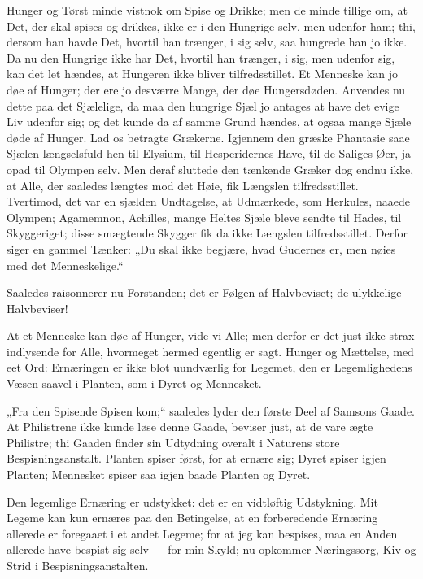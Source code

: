 \documentclass[12pt,a4paper]{book}
\newcommand{\apage}[1]{\marginnote{\footnotesize\textit{[#1]}}}
\begin{document}
Hunger og Tørst minde vistnok om Spise og Drikke; men de minde tillige om,
at Det, der skal spises og drikkes, ikke er i den Hungrige selv, men
udenfor ham; thi, dersom han havde Det, hvortil han trænger, i sig selv,
saa hungrede han jo ikke. Da nu den Hungrige ikke har Det, hvortil han
trænger, i sig, men udenfor sig, kan det let hændes, at Hungeren ikke
bliver tilfredsstillet. Et Menneske kan jo døe af Hunger; der ere jo
desværre Mange, der døe Hungersdøden. Anvendes nu dette paa det Sjælelige,
da maa den hungrige
Sjæl jo antages at have det evige Liv udenfor sig; og det kunde da af
samme Grund hændes, at ogsaa mange Sjæle døde af Hunger. Lad os betragte
Grækerne. Igjennem den græske Phantasie saae Sjælen længselsfuld hen til
Elysium, til Hesperidernes Have, til de Saliges Øer, ja opad til Olympen
selv. Men deraf sluttede den tænkende Græker dog endnu ikke, at Alle, der
saaledes længtes mod det Høie, fik Længslen tilfredsstillet. Tvertimod,
det var en sjælden Undtagelse, at Udmærkede, som Herkules, naaede
Olympen; Agamemnon, Achilles, mange Heltes Sjæle bleve sendte til Hades,
til Skyggeriget; disse smægtende Skygger fik da ikke Længslen
tilfredsstillet. Derfor siger en gammel Tænker: „Du skal ikke begjære,
hvad Gudernes er, men nøies med det Menneskelige.“

Saaledes raisonnerer nu Forstanden; det er Følgen af Halvbeviset; de
ulykkelige Halvbeviser!

At et Menneske kan døe af Hunger, vide vi Alle; men derfor er det just
ikke strax indlysende for Alle, hvormeget hermed egentlig er sagt. Hunger
og Mættelse, med eet Ord: Ernæringen er ikke blot uundværlig for Legemet,
den er Legemlighedens Væsen saavel i Planten, som i Dyret og Mennesket.

„Fra den Spisende Spisen kom;“ saaledes lyder den første Deel af Samsons
Gaade. At Philistrene ikke kunde løse denne Gaade, beviser just, at de
vare ægte Philistre; thi Gaaden finder sin Udtydning overalt i Naturens
store Bespisningsanstalt. Planten spiser først, for at ernære sig; Dyret
spiser igjen Planten; Mennesket spiser saa igjen baade Planten og Dyret.

Den legemlige Ernæring er udstykket: det er en vidtløftig Udstykning. Mit
Legeme kan kun ernæres paa den Betingelse, at en forberedende Ernæring
allerede er foregaaet i et andet Legeme; for at jeg kan bespises, maa en
Anden allerede have bespist sig selv --- for min Skyld; nu opkommer
Næringssorg, Kiv og Strid i Bespisningsanstalten.
 \apage{26}
\end{document}
